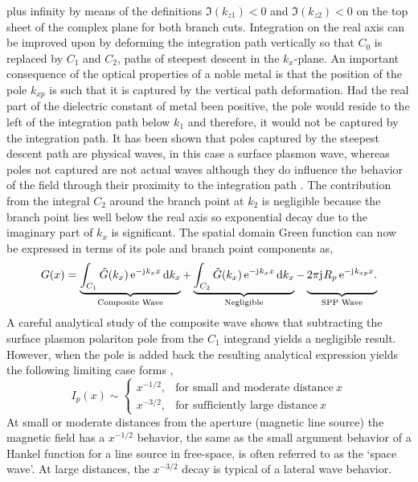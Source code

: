 \documentclass[11pt]{article}
\begin{document}
%
plus infinity by means of the definitions $\Im (k_{z1}) < 0$ and $\Im (k_{z2}) < 0$ on the top sheet of the complex plane for both branch cuts. Integration on the real axis can be improved upon by deforming the integration path vertically so that $C_0$ is replaced by $C_1$ and $C_2$, paths of steepest descent in the  $k_x$-plane. An important consequence of the optical properties of a noble metal is that the position of the pole $k_{xp}$ is such that it is captured by the vertical path deformation. Had the real part of the dielectric constant of metal been positive, the pole would reside to the left of the integration path below $k_1$ and therefore, it would not be captured by the integration path. It has been shown that poles captured by the steepest descent path are physical waves, in this case a surface plasmon wave, whereas poles not captured are not actual waves although they do influence the behavior of the field through their proximity to the integration path \cite{Collin2004}. The contribution from the
integral $C_2$ around the branch point at $k_2$ is negligible because the branch point lies well below the real axis so exponential decay due to the imaginary part of $k_x$ is significant. The spatial domain Green function can now be expressed in terms of its pole and branch point components as,
%
\begin{equation}
  G(x) = \underbrace {\int_{C_1} \ti G(k_x) \, \e^{-\j k_x x}\diff{k_x}}_{\text{Composite Wave}} +
  \underbrace{\vphantom{\int_{C_1} \ti G(k_x) \, \e^{-\j k_x x} \diff{k_x}} { \int_{C_2} \ti G(k_x) \, \e^{ - \j k_x x} \diff{k_x}}}_{\text{Negligible}} -
  \underbrace{
  \vphantom{\int_{C_1} \ti G(k_x) \, \e^{-\j k_x x} \diff{k_x}} {2\pi \j R_p}
  \, \e^{ -\j k_{xp} x}.}_{\text{SPP Wave}}
  \label{eq:GF_breakup}
\end{equation}
%
A careful analytical study of the composite wave shows that subtracting the surface plasmon polariton pole from the $C_1$ integrand yields a negligible result. However, when the pole is added back the resulting analytical expression yields the following limiting case forms \cite{Nevels2014},
%
\begin{equation}
  I_p(x) \sim
  \begin{cases}
    x^{-1/2}, & \text{for small and moderate distance}\ x \\
    x^{-3/2}, & \text{for sufficiently large distance}\ x
  \end{cases}
  \label{eq:spp_range}
\end{equation}
%
At small or moderate distances from the aperture (magnetic line source) the magnetic field has a $x^{-1/2}$ behavior, the same as the small argument behavior of a Hankel function for a line source in free-space, is often referred to as the  `space wave'. At large distances, the $x^{-3/2}$ decay is typical of a lateral wave behavior.
\end{document}
